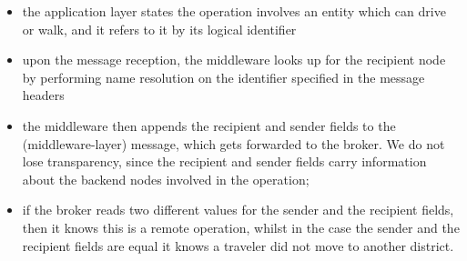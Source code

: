 \begin{itemize}
  \item the application layer states the operation involves an entity which can
  drive or walk, and it refers to it by its logical identifier
  \item upon the message reception, the middleware looks up for the recipient
    node by performing name resolution on the identifier specified in the
    message headers
  \item the middleware then appends the recipient and sender fields to the
    (middleware-layer) message, which gets forwarded to the broker. We do not
    lose transparency, since the recipient and sender fields carry information
    about the backend nodes involved in the operation;
  \item if the broker reads two different values for the sender and the
    recipient fields, then it knows this is a remote operation, whilst in the
    case the sender and the recipient fields are equal it knows a traveler did
    not move to another district.
\end{itemize}
